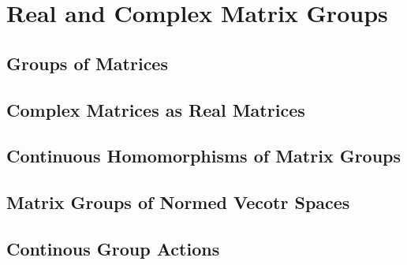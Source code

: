 \chapter{Real and Complex Matrix Groups}

\section{Groups of Matrices}

\section{Complex Matrices as Real Matrices}

\section{Continuous Homomorphisms of Matrix Groups}

\section{Matrix Groups of Normed Vecotr Spaces}

\section{Continous Group Actions}
